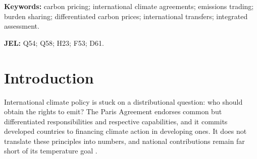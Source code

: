 \documentclass[12pt,english]{article}
\newif\ifblind
\theoremstyle{remark}
\begin{document}
\begin{abstract}
\noindent Recent proposals for international carbon pricing differentiate national carbon prices by income. The usual justification is that cross-border transfers are politically infeasible. But differentiated prices are themselves equivalent to transfers. We show that any schedule of national autarky prices is distributionally equivalent to a uniform price combined with a certain allocation of tradable emission rights, equal, to first order, to each country's emissions under autarky.
In a dynamic setting, the equivalent rights are weighted by the discounted carbon price, and under Hotelling pricing they reduce to a carbon budget. Because abatement costs are convex, this allocation leaves every country weakly better off, so the uniform price with equivalent rights Pareto-dominates autarky.
We quantify the equivalence in NICE, an integrated assessment model with 179 countries.
Replacing the schedules of \citet{parry_proposal_2021}, \citet{wolfram_building_2025}, or \citet{banerjee_grand_2025} with a uniform price and equivalent rights would cut the coalition's emissions by 4--5\% while leaving every member as well off. Alternatively, holding emissions fixed, it would raise every member's consumption by about 0.05\%, half the implicit transfers of differentiation: differentiation loses about half a dollar of consumption for every dollar of implicit transfer.
We also review the departures from standard assumptions that could justify price differentiation and argue that they are less compelling than often thought.

\end{abstract}

\medskip
\noindent\textbf{Keywords:} carbon pricing; international climate agreements; emissions trading; burden sharing; differentiated carbon prices; international transfers; integrated assessment.

\noindent\textbf{JEL:} Q54; Q58; H23; F53; D61.

\clearpage

\ifblind
  \doublespacing
  \linenumbers
\else
  \tableofcontents
\fi

\section{Introduction}
\label{sec:intro}

International climate policy is stuck on a distributional question: who should obtain the rights to emit? The Paris Agreement endorses common but differentiated responsibilities and respective capabilities, and it commits developed countries to financing climate action in developing ones. It does not translate these principles into numbers, and national contributions remain far short of its temperature goal \citep{unep_emissions_2025}.
\end{document}
